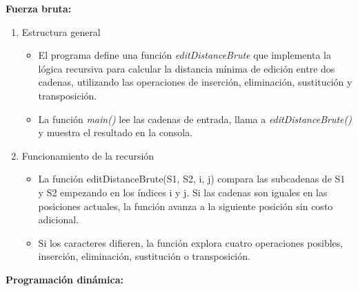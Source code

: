 \textbf{Fuerza bruta:}

\begin{enumerate}
    \item Estructura general
    \begin{itemize}
        \item El programa define una función \textit{editDistanceBrute} que implementa la lógica recursiva para calcular la distancia mínima de edición entre dos cadenas, utilizando las operaciones de inserción, eliminación, sustitución y transposición.

        \item La función \textit{main()} lee las cadenas de entrada, llama a \textit{editDistanceBrute()} y muestra el resultado en la consola.
    \end{itemize}

    \item Funcionamiento de la recursión
    \begin{itemize}
        \item La función editDistanceBrute(S1, S2, i, j) compara las subcadenas de S1 y S2 empezando en los índices i y j. Si las cadenas son iguales en las posiciones actuales, la función avanza a la siguiente posición sin costo adicional.

        \item Si los caracteres difieren, la función explora cuatro operaciones posibles, inserción, eliminación, sustitución o transposición.
    \end{itemize}
\end{enumerate}

\textbf{Programación dinámica:}

